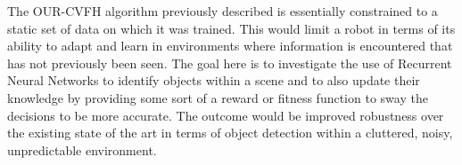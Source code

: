 The OUR-CVFH algorithm previously described is essentially constrained to a static set of data on which it was trained. This would limit a robot in terms of its ability to adapt and learn in environments where information is encountered that has not previously been seen. The goal here is to investigate the use of Recurrent Neural Networks to identify objects within a scene and to also update their knowledge by providing some sort of a reward or fitness function to sway the decisions to be more accurate. The outcome would be improved robustness over the existing state of the art in terms of object detection within a cluttered, noisy, unpredictable environment. 